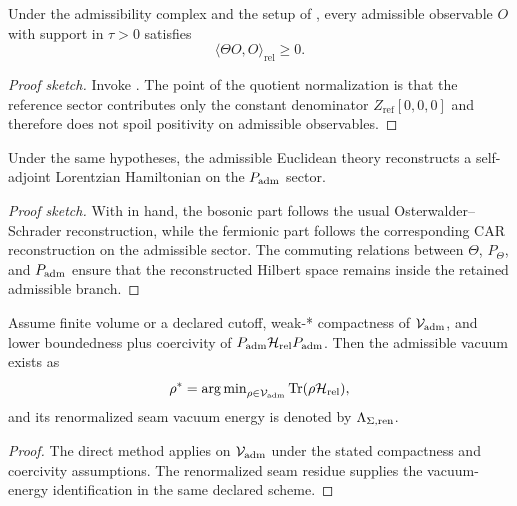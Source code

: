 \begin{theorem}
\label{thm:reflection-positivity-admissible}
Under the admissibility complex and the setup of , every admissible observable $O$ with support in $\tau>0$ satisfies
\[
\langle \Theta O,O\rangle_{\mathrm{rel}}\ge 0.
\]
\end{theorem}

\begin{proof}[Proof sketch]
Invoke . The point of the quotient normalization is that the reference sector contributes only the constant denominator $Z_{\mathrm{ref}}[0,0,0]$ and therefore does not spoil positivity on admissible observables.
\end{proof}

\begin{theorem}
\label{thm:lorentzian-reconstruction}
Under the same hypotheses, the admissible Euclidean theory reconstructs a self-adjoint Lorentzian Hamiltonian on the $P_{\mathrm{adm}}$ sector.
\end{theorem}

\begin{proof}[Proof sketch]
With  in hand, the bosonic part follows the usual Osterwalder--Schrader reconstruction, while the fermionic part follows the corresponding CAR reconstruction on the admissible sector. The commuting relations between $\Theta$, $P_\Theta$, and $P_{\mathrm{adm}}$ ensure that the reconstructed Hilbert space remains inside the retained admissible branch.
\end{proof}

\begin{theorem}
\label{thm:admissible-vacuum-existence}
Assume finite volume or a declared cutoff, weak-* compactness of $\mathcal V_{\mathrm{adm}}$, and
lower boundedness plus coercivity of $P_{\mathrm{adm}}\mathcal H_{\mathrm{rel}}P_{\mathrm{adm}}$. Then the admissible
vacuum exists as
\[
\rho^\ast=\operatorname{arg\,min}_{\rho\in\mathcal V_{\mathrm{adm}}}\operatorname{Tr}(\rho\mathcal H_{\mathrm{rel}}),
\]
and its renormalized seam vacuum energy is denoted by $\Lambda_{\Sigma,\mathrm{ren}}$.
\end{theorem}

\begin{proof}
The direct method applies on $\mathcal V_{\mathrm{adm}}$ under the stated compactness and coercivity
assumptions. The renormalized seam residue supplies the vacuum-energy
identification in the same declared scheme.
\end{proof}
